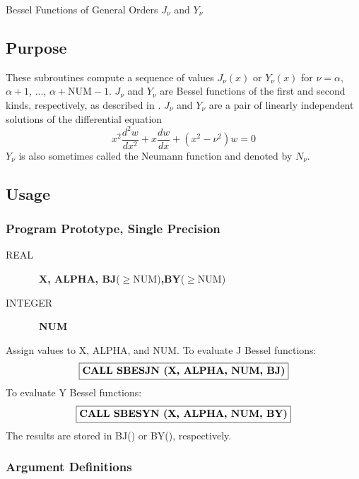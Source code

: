 \documentclass[twoside]{MATH77}
\begin{document}
 Bessel Functions of General Orders $J_\nu $ and $Y_\nu $


\subsection{Purpose}

These subroutines compute a sequence of values $J_\nu (x)$ or $Y_\nu (x)$
for $\nu = \alpha $, $\alpha + 1$, ..., $\alpha +\text{NUM} - 1$. $J_\nu $
and $Y_\nu $ are Bessel functions of the first and second kinds,
respectively, as described in \cite{ams55:bes}. $J_\nu $ and $Y_\nu $ are a
pair of linearly independent solutions of the differential equation
\begin{equation*}
x^2\frac{d^2w}{dx^2} + x\frac{dw}{dx} + (x^2 - \nu ^2)w = 0
\end{equation*}
$Y_\nu $ is also sometimes called the Neumann function and denoted by $N_\nu
.$

\subsection{Usage}

\subsubsection{Program Prototype, Single Precision}

\begin{description}
\item[REAL]  \ {\bf X, ALPHA, BJ}($\geq $NUM){\bf ,BY}($\geq $NUM)

\item[INTEGER]  \ {\bf NUM}
\end{description}

Assign values to X, ALPHA, and NUM. To evaluate J Bessel functions:
$$
\fbox{{\bf CALL SBESJN (X, ALPHA, NUM, BJ)}}
$$
To evaluate Y Bessel functions:
$$
\fbox{{\bf CALL SBESYN (X, ALPHA, NUM, BY)}}
$$
The results are stored in BJ() or BY(), respectively.

\subsubsection{Argument Definitions}
\end{document}
